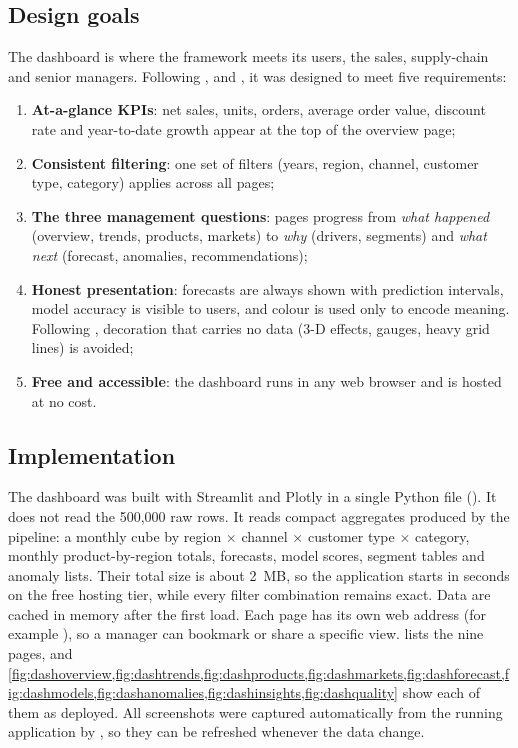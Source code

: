 \subsection{Design goals}
The dashboard is where the framework meets its users, the sales, supply-chain and senior managers. Following
\citet{few2013}, \citet{tufte2001} and \citet{knaflic2015}, it was designed to meet five requirements:
\begin{enumerate}
  \item \textbf{At-a-glance KPIs}: net sales, units, orders, average order value, discount rate and
        year-to-date growth appear at the top of the overview page;
  \item \textbf{Consistent filtering}: one set of filters (years, region, channel, customer type, category)
        applies across all pages;
  \item \textbf{The three management questions}: pages progress from \emph{what happened} (overview, trends,
        products, markets) to \emph{why} (drivers, segments) and \emph{what next} (forecast, anomalies,
        recommendations);
  \item \textbf{Honest presentation}: forecasts are always shown with prediction intervals, model accuracy is
        visible to users, and colour is used only to encode meaning. Following \citet{tufte2001}, decoration
        that carries no data (3-D effects, gauges, heavy grid lines) is avoided;
  \item \textbf{Free and accessible}: the dashboard runs in any web browser and is hosted at no cost.
\end{enumerate}

\subsection{Implementation}
The dashboard was built with Streamlit and Plotly in a single Python file (). It does
not read the 500,000 raw rows. It reads compact aggregates produced by the pipeline: a monthly cube by region
$\times$ channel $\times$ customer type $\times$ category, monthly product-by-region totals, forecasts, model
scores, segment tables and anomaly lists. Their total size is about 2~MB, so the application starts in seconds
on the free hosting tier, while every filter combination remains exact. Data are cached in memory after the
first load. Each page has its own web address (for example ), so a manager can bookmark
or share a specific view.  lists the nine pages, and
\cref{fig:dashoverview,fig:dashtrends,fig:dashproducts,fig:dashmarkets,fig:dashforecast,fig:dashmodels,fig:dashanomalies,fig:dashinsights,fig:dashquality}
show each of them as deployed. All screenshots were captured automatically from the running application by
, so they can be refreshed whenever the data change.

